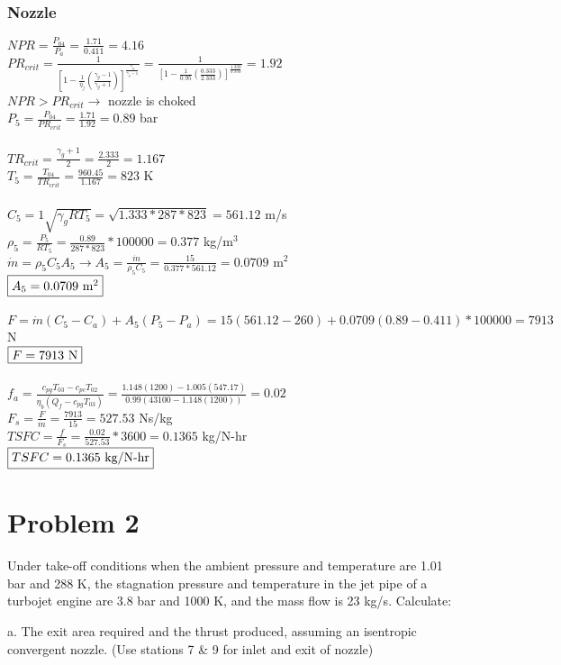 \documentclass{article}
\begin{document}
\subsubsection*{Nozzle}
$NPR=\frac{P_{04}}{P_a}=\frac{1.71}{0.411}=4.16$ \\
$PR_{crit}=\frac{1}{[1-\frac{1}{\eta_j}(\frac{\gamma_g-1}{\gamma_g+1})]
^\frac{\gamma_g}{\gamma_g-1}}=\frac{1}{[1-\frac{1}{0.95}(\frac{0.333}{2.333})]
^\frac{1.333}{0.333}}=1.92$ \\
$NPR>PR_{crit} \rightarrow$ nozzle is choked \\
$P_5=\frac{P_{04}}{PR_{crit}}=\frac{1.71}{1.92}=0.89$ bar \\\\
$TR_{crit}=\frac{\gamma_g+1}{2}=\frac{2.333}{2}=1.167$ \\
$T_5=\frac{T_{04}}{TR_{crit}}=\frac{960.45}{1.167}=823$ K \\\\
$C_5=1\sqrt{\gamma_gRT_5}=\sqrt{1.333*287*823}=561.12$ m/s \\
$\rho_5=\frac{P_5}{RT_5}=\frac{0.89}{287*823}*100000=0.377$ kg/m$^3$ \\
$\dot{m}=\rho_5C_5A_5 \rightarrow A_5=\frac{\dot{m}}{\rho_5C_5}=\frac{15}{0.377*561.12}
=0.0709$ m$^2$ \\
$\fbox{$A_5=0.0709$ m$^2$}$ \\\\
$F=\dot{m}(C_5-C_a)+A_5(P_5-P_a)=15(561.12-260)+0.0709(0.89-0.411)*100000=7913$ N \\
$\fbox{$F=7913$ N}$ \\\\
$f_a=\frac{c_{pg}T_{03}-c_{pc}T_{02}}{\eta_b(Q_f-c_{pg}T_{03})}=
\frac{1.148(1200)-1.005(547.17)}{0.99(43100-1.148(1200))}=0.02$ \\
$F_s=\frac{F}{\dot{m}}=\frac{7913}{15}=527.53$ Ns/kg \\
$TSFC=\frac{f}{F_s}=\frac{0.02}{527.53}*3600=0.1365$ kg/N-hr \\
$\fbox{$TSFC=0.1365$ kg/N-hr}$

\section*{Problem 2}
Under take-off conditions when the ambient pressure and temperature are 1.01
bar and 288 K, the stagnation pressure and temperature in the jet pipe of a turbojet
engine are 3.8 bar and 1000 K, and the mass flow is 23 kg/s. Calculate:

a. The exit area required and the thrust produced, assuming an isentropic
convergent nozzle. (Use stations 7 \& 9 for inlet and exit of nozzle)
\end{document}
